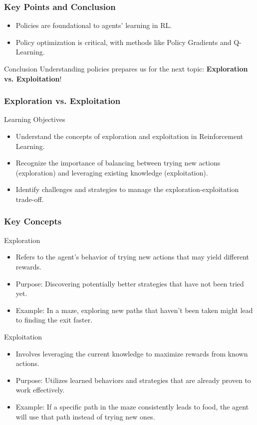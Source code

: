 \documentclass[aspectratio=169]{beamer}
\begin{document}
\begin{frame}[fragile]
    \frametitle{Key Points and Conclusion}
    \begin{itemize}
        \item Policies are foundational to agents' learning in RL.
        \item Policy optimization is critical, with methods like Policy Gradients and Q-Learning.
    \end{itemize}
    \begin{block}{Conclusion}
        Understanding policies prepares us for the next topic: \textbf{Exploration vs. Exploitation}!
    \end{block}
\end{frame}

\begin{frame}[fragile]
    \frametitle{Exploration vs. Exploitation}
    \begin{block}{Learning Objectives}
        \begin{itemize}
            \item Understand the concepts of exploration and exploitation in Reinforcement Learning.
            \item Recognize the importance of balancing between trying new actions (exploration) and leveraging existing knowledge (exploitation).
            \item Identify challenges and strategies to manage the exploration-exploitation trade-off.
        \end{itemize}
    \end{block}
\end{frame}

\begin{frame}[fragile]
    \frametitle{Key Concepts}
    \begin{block}{Exploration}
        \begin{itemize}
            \item Refers to the agent's behavior of trying new actions that may yield different rewards.
            \item Purpose: Discovering potentially better strategies that have not been tried yet.
            \item Example: In a maze, exploring new paths that haven't been taken might lead to finding the exit faster.
        \end{itemize}
    \end{block}
    
    \begin{block}{Exploitation}
        \begin{itemize}
            \item Involves leveraging the current knowledge to maximize rewards from known actions.
            \item Purpose: Utilizes learned behaviors and strategies that are already proven to work effectively.
            \item Example: If a specific path in the maze consistently leads to food, the agent will use that path instead of trying new ones.
        \end{itemize}
    \end{block}
\end{frame}
\end{document}
